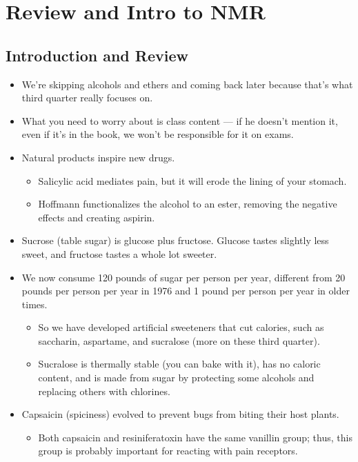 \documentclass[../notes.tex]{subfiles}
\begin{document}
\chapter{Review and Intro to NMR}
\section{Introduction and Review}
\begin{itemize}
    \item {}We're skipping alcohols and ethers and coming back later because that's what third quarter really focuses on.
    \item What you need to worry about is class content --- if he doesn't mention it, even if it's in the book, we won't be responsible for it on exams.
    \item Natural products inspire new drugs.
    \begin{itemize}
        \item Salicylic acid mediates pain, but it will erode the lining of your stomach.
        \item Hoffmann functionalizes the alcohol to an ester, removing the negative effects and creating aspirin.
    \end{itemize}
    \item Sucrose (table sugar) is glucose plus fructose. Glucose tastes slightly less sweet, and fructose tastes a whole lot sweeter.
    \item We now consume 120 pounds of sugar per person per year, different from 20 pounds per person per year in 1976 and 1 pound per person per year in older times.
    \begin{itemize}
        \item So we have developed artificial sweeteners that cut calories, such as saccharin, aspartame, and sucralose (more on these third quarter).
        \item Sucralose is thermally stable (you can bake with it), has no caloric content, and is made from sugar by protecting some alcohols and replacing others with chlorines.
    \end{itemize}
    \item Capsaicin (spiciness) evolved to prevent bugs from biting their host plants.
    \begin{itemize}
        \item Both capsaicin and resiniferatoxin have the same vanillin group; thus, this group is probably important for reacting with pain receptors.
    \end{itemize}

\end{itemize}
\end{document}
